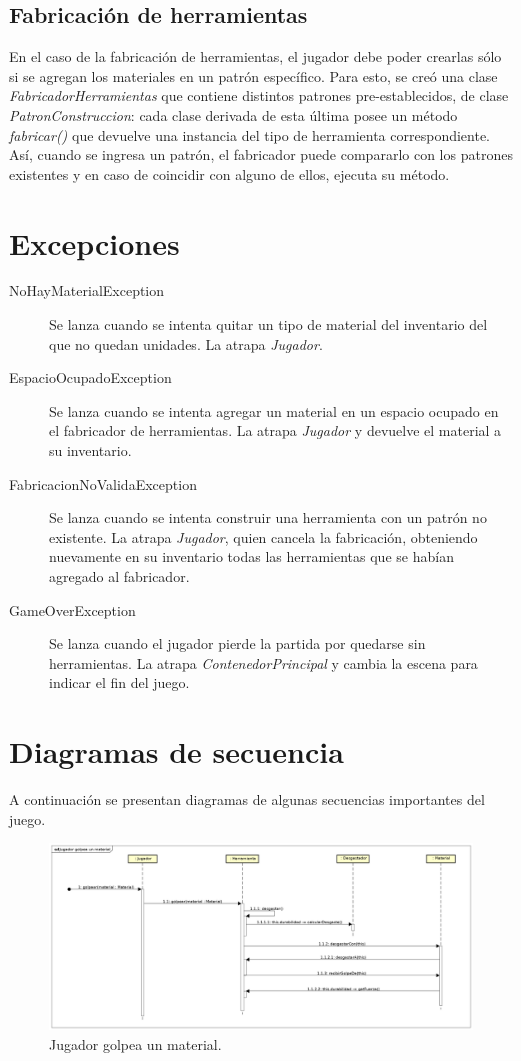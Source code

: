 \documentclass[titlepage,a4paper]{article}
\begin{document}
\subsection{Fabricación de herramientas}
	En el caso de la fabricación de herramientas, el jugador debe poder crearlas sólo si se agregan los materiales en un patrón específico. Para esto, se creó una clase \emph{FabricadorHerramientas} que contiene distintos patrones pre-establecidos, de clase \emph{PatronConstruccion}: cada clase derivada de esta última posee un método \emph{fabricar()} que devuelve una instancia del tipo de herramienta correspondiente. Así, cuando se ingresa un patrón, el fabricador puede compararlo con los patrones existentes y en caso de coincidir con alguno de ellos, ejecuta su método.

\section{Excepciones}\label{sec:excepciones}
\begin{description}
	\item[NoHayMaterialException] Se lanza cuando se intenta quitar un tipo de material del inventario del que no quedan unidades. La atrapa \emph{Jugador}. 
	\item[EspacioOcupadoException] Se lanza cuando se intenta agregar un material en un espacio ocupado en el fabricador de herramientas. La atrapa \emph{Jugador} y devuelve el material a su inventario.
	\item[FabricacionNoValidaException] Se lanza cuando se intenta construir una herramienta con un patrón no existente. La atrapa \emph{Jugador}, quien cancela la fabricación, obteniendo nuevamente en su inventario todas las herramientas que se habían agregado al fabricador.
	\item[GameOverException] Se lanza cuando el jugador pierde la partida por quedarse sin herramientas. La atrapa \emph{ContenedorPrincipal} y cambia la escena para indicar el fin del juego.
\end{description}

\section{Diagramas de secuencia}\label{sec:diagramasdesecuencia}
A continuación se presentan diagramas de algunas secuencias importantes del juego.

\begin{figure}[H]
\centering
\includegraphics[width=\textwidth]{Diagramas/JugadorGolpeaMaterial.png}
\caption{\label{fig:jugadorGolpeaMaterial}Jugador golpea un material.}
\end{figure}
\end{document}
